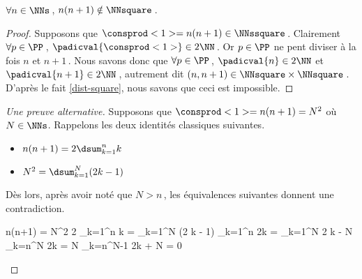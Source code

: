 \begin{fact} \label{case-1}
	 $\forall n \in \NNs$\,, $n(n+1) \notin \NNsquare$\,.
\end{fact}




\begin{proof}
    Supposons que $\consprod<1> = n(n+1) \in \NNssquare$\,.
    Clairement $\forall p \in \PP$\,, $\padicval{\consprod<1>} \in 2 \NN$\,.
    Or $p \in \PP$ ne pent diviser à la fois $n$ et $n+1$\,.
    Nous savons donc que $\forall p \in \PP$\,, 
    $\padicval{n} \in 2 \NN$ et $\padicval{n+1} \in 2 \NN$\,,
    autrement dit 
    $(n, n + 1) \in \NNsquare \times \NNsquare$\,.
    D'après le fait \ref{dist-square}, nous savons que ceci est impossible.
\end{proof}




\begin{proof}[Une preuve alternative]
     Supposons que $\consprod<1> = n(n+1) = N^2$ où $N \in \NNs$.
     Rappelons les deux identités classiques suivantes.
     \begin{itemize}
     	\item $n(n+1) = 2 \dsum_{k=1}^{n} k$

     	\item $N^2 = \dsum_{k=1}^{N} (2 k - 1)$
     \end{itemize}
     Dès lors, après avoir noté que $N > n$\,, les équivalences suivantes donnent une contradiction.
	
	\medskip
	
	\begin{stepcalc}[style = sar, ope = \iff]
		n(n+1) = N^2
	\explnext{}
		2 \dsum_{k=1}^{n} k = \dsum_{k=1}^{N} (2 k - 1)
	\explnext{}
		\dsum_{k=1}^{n} 2k = \dsum_{k=1}^{N} 2 k - N
	\explnext{}
		\dsum_{k=n}^{N} 2k = N
		\dsum_{k=n}^{N-1} 2k + N = 0
	\end{stepcalc}

	\vspace{-2ex}	
	\leavevmode
\end{proof}
